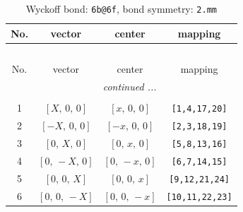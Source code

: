 \documentclass[fleqn,8pt]{jsarticle}
\begin{document}
\renewcommand{\arraystretch}{1.2}
\begin{longtable}{cccc}
\caption{Wyckoff bond: {\tt 6b@6f}, bond symmetry: {\tt 2.mm}}
 \\
 \hline \hline
No. & vector & center & mapping \\ \hline \endfirsthead

\multicolumn{3}{l}{\tablename\ \thetable{}} \\
 \hline \hline
No. & vector & center & mapping \\ \hline \endhead

 \hline \hline
\multicolumn{3}{r}{\footnotesize\it continued ...} \\ \endfoot

 \hline \hline
\multicolumn{3}{r}{} \\ \endlastfoot

1 & $\left[ X,\, 0,\, 0 \right]$ & $\left[ x,\, 0,\, 0 \right]$ & {\tt [1,4,17,20]} \\ \hline
2 & $\left[ - X,\, 0,\, 0 \right]$ & $\left[ - x,\, 0,\, 0 \right]$ & {\tt [2,3,18,19]} \\ \hline
3 & $\left[ 0,\, X,\, 0 \right]$ & $\left[ 0,\, x,\, 0 \right]$ & {\tt [5,8,13,16]} \\ \hline
4 & $\left[ 0,\, - X,\, 0 \right]$ & $\left[ 0,\, - x,\, 0 \right]$ & {\tt [6,7,14,15]} \\ \hline
5 & $\left[ 0,\, 0,\, X \right]$ & $\left[ 0,\, 0,\, x \right]$ & {\tt [9,12,21,24]} \\ \hline
6 & $\left[ 0,\, 0,\, - X \right]$ & $\left[ 0,\, 0,\, - x \right]$ & {\tt [10,11,22,23]} \\
\end{longtable}
\renewcommand{\arraystretch}{1.2}
\end{document}

